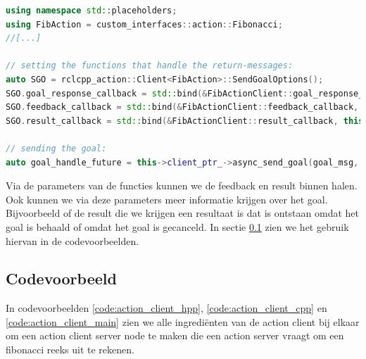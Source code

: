 \begin{lstlisting}[language=C++, caption={}, firstnumber=0, label={}]
using namespace std::placeholders;
using FibAction = custom_interfaces::action::Fibonacci;
//[...]

// setting the functions that handle the return-messages:
auto SGO = rclcpp_action::Client<FibAction>::SendGoalOptions();
SGO.goal_response_callback = std::bind(&FibActionClient::goal_response_callback, this,_1);
SGO.feedback_callback = std::bind(&FibActionClient::feedback_callback, this, _1, _2);
SGO.result_callback = std::bind(&FibActionClient::result_callback, this, _1);

// sending the goal:
auto goal_handle_future = this->client_ptr_->async_send_goal(goal_msg, SGO);
\end{lstlisting}

Via de parameters van de functies kunnen we de feedback en result binnen halen. Ook kunnen we via deze parameters meer informatie krijgen over het goal. Bijvoorbeeld of de result die we krijgen een resultaat is dat is ontstaan omdat het goal is behaald of omdat het goal is gecanceld. In sectie \ref{sec:action_client_code} zien we het gebruik hiervan in de codevoorbeelden.

\subsection{Codevoorbeeld}
\label{sec:action_client_code}
In codevoorbeelden \ref{code:action_client_hpp}, \ref{code:action_client_cpp} en \ref{code:action_client_main} zien we alle ingrediënten van de action client bij elkaar om een action client server node te maken die een action server vraagt om een fibonacci reeks uit te rekenen.

